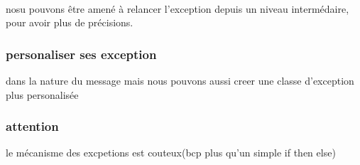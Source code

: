 \documentclass[a4paper,10pt]{article}
\begin{document}
\paragraph{}
nosu pouvons être amené à relancer l'exception depuis un niveau intermédaire, pour avoir plus de précisions.
\subsubsection{personaliser ses exception}
dans la nature du message
\newline
mais nous pouvons aussi creer une classe d'exception plus personalisée
\subsubsection{attention}
le mécanisme des excpetions est couteux(bcp plus qu'un simple if then else)
\end{document}
